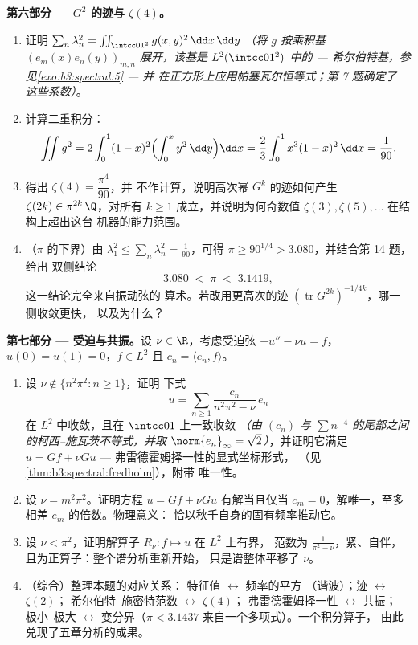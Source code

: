 \begin{problem}
\medskip
\noindent\textbf{第六部分 --- $G^2$ 的迹与
$\zeta(4)$。}
\begin{enumerate}[resume]
  \item 证明 $\sum_n\lambda_n^2 =
        \iint_{\intcc01^2}g(x,y)^2\,\dd x\,\dd y$
        \emph{（将 $g$ 按乘积基
        $(e_m(x)e_n(y))_{m,n}$ 展开，该基是 $L^2(\intcc01^2)$ 中的 ---
        希尔伯特基，参见\cref{exo:b3:spectral:5} --- 并
        在正方形上应用帕塞瓦尔恒等式；第 7 题确定了
        这些系数）}。
  \item 计算二重积分：
        \[
        \iint g^2 = 2\int_0^1(1-x)^2\Bigl(\int_0^x
        y^2\,\dd y\Bigr)\dd x
        = \frac23\int_0^1x^3(1-x)^2\,\dd x = \frac1{90} .
        \]
  \item 得出 $\zeta(4) = \dfrac{\pi^4}{90}$，并
        不作计算，说明高次幂
        $G^k$ 的迹如何产生 $\zeta(2k) \in \pi^{2k}\,\Q$，对所有
        $k \geq 1$ 成立，并说明为何奇数值 $\zeta(3),
        \zeta(5), \dots$ 在结构上超出这台
        机器的能力范围。
  \item （$\pi$ 的下界）由 $\lambda_1^2 \leq
        \sum_n\lambda_n^2 = \frac1{90}$，可得 $\pi \geq
        90^{1/4} > 3.080$，并结合第 14 题，给出
        双侧结论
        \[
        3.080 \;<\; \pi \;<\; 3.1419,
        \]
        这一结论完全来自振动弦的
        算术。若改用更高次的迹
        $(\operatorname{tr}G^{2k})^{-1/4k}$，哪一侧收敛更快，
        以及为什么？
\end{enumerate}

\medskip
\noindent\textbf{第七部分 --- 受迫与共振。}设
$\nu \in \R$，考虑受迫弦 $-u'' - \nu u =
f$，$u(0) = u(1) = 0$，$f \in L^2$ 且 $c_n = \langle
e_n, f\rangle$。
\begin{enumerate}[resume]
  \item 设 $\nu \notin \{n^2\pi^2 : n \geq 1\}$，证明
        下式
        \[
        u = \sum_{n\geq1}\frac{c_n}{n^2\pi^2 - \nu}\,e_n
        \]
        在 $L^2$ 中收敛，且在 $\intcc01$ 上一致收敛
        \emph{（由 $(c_n)$ 与
        $\sum n^{-4}$ 的尾部之间的柯西–施瓦茨不等式，并取 $\norm{e_n}_\infty =
        \sqrt2$）}，并证明它满足 $u = Gf + \nu Gu$
        --- 弗雷德霍姆择一性的显式坐标形式，
        （见\cref{thm:b3:spectral:fredholm}），附带
        唯一性。
  \item 设 $\nu = m^2\pi^2$。证明方程 $u = Gf + \nu
        Gu$ 有解当且仅当 $c_m = 0$，解唯一，至多相差
        $e_m$ 的倍数。物理意义：
        恰以秋千自身的固有频率推动它。
  \item 设 $\nu < \pi^2$，证明解算子
        $R_\nu\colon f \mapsto u$ 在 $L^2$ 上有界，
        范数为 $\frac1{\pi^2 - \nu}$，紧、自伴，
        且为正算子：整个谱分析重新开始，
        只是谱整体平移了 $\nu$。
  \item （综合）整理本题的对应关系：
        特征值 $\leftrightarrow$ 频率的平方
        （谐波）；迹 $\leftrightarrow$ $\zeta(2)$；
        希尔伯特–施密特范数 $\leftrightarrow$ $\zeta(4)$；
        弗雷德霍姆择一性 $\leftrightarrow$ 共振；
        极小–极大 $\leftrightarrow$ 变分界（$\pi <
        3.1437$ 来自一个多项式）。一个积分算子，
        由此兑现了五章分析的成果。
\end{enumerate}


\end{problem}
